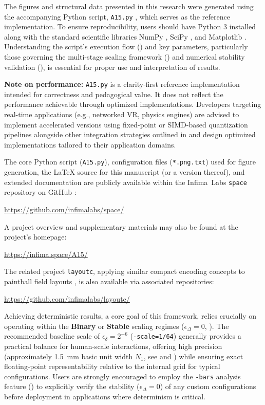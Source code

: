 \documentclass[10pt]{article}
\def\IL{Infima~Labs}
\begin{document}
The figures and structural data presented in this research were generated using the accompanying Python script, \texttt{A15.py} \cite{Risinger2024A15}, which serves as the reference implementation. To ensure reproducibility, users should have Python 3 installed along with the standard scientific libraries NumPy \cite{Harris2020}, SciPy \cite{Virtanen2020}, and Matplotlib \cite{Hunter2007}. Understanding the script's execution flow () and key parameters, particularly those governing the multi-stage scaling framework () and numerical stability validation (), is essential for proper use and interpretation of results.

\textbf{Note on performance:} \texttt{A15.py} is a clarity-first reference implementation intended for correctness and pedagogical value. It does not reflect the performance achievable through optimized implementations. Developers targeting real-time applications (e.g., networked VR, physics engines) are advised to implement accelerated versions using fixed-point or SIMD-based quantization pipelines alongside other integration strategies outlined in  and design optimized implementations tailored to their application domains.

The core Python script (\texttt{A15.py}), configuration files (\texttt{*.png.txt}) used for figure generation, the LaTeX source for this manuscript (or a version thereof), and extended documentation are publicly available within the \IL{} \texttt{space} repository on GitHub \cite{InfimaSpace}:
\begin{center}
    \url{https://github.com/infimalabs/space/}
\end{center}
A project overview and supplementary materials may also be found at the project's homepage:
\begin{center}
    \url{https://infima.space/A15/}
\end{center}
The related project \texttt{layoutc}, applying similar compact encoding concepts to paintball field layouts \cite{Risinger2024Layoutc}, is also available via associated repositories:
\begin{center}
    \url{https://github.com/infimalabs/layoutc/}
\end{center}

Achieving deterministic results, a core goal of this framework, relies crucially on operating within the \textbf{Binary} or \textbf{Stable} scaling regimes ($\epsilon_\Delta = 0$, ). The recommended baseline scale of $\epsilon_\delta = 2^{-6}$ (\texttt{-scale=1/64}) generally provides a practical balance for human-scale interactions, offering high precision (approximately \SI{1.5}{\milli\meter} basic unit width $N_1$, see  and ) while ensuring exact floating-point representability relative to the internal grid for typical configurations. Users are strongly encouraged to employ the \texttt{-bars} analysis feature () to explicitly verify the stability ($\epsilon_\Delta = 0$) of any custom configurations before deployment in applications where determinism is critical.
\end{document}
